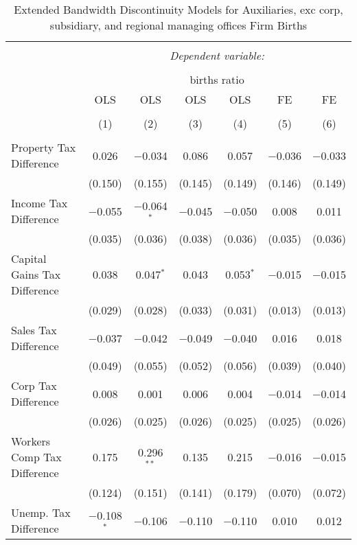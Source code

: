 
\begin{table}[!htbp] \centering 
  \caption{Extended Bandwidth Discontinuity Models for  Auxiliaries, exc corp, subsidiary, and regional managing offices Firm Births} 
  \label{95rd} 
\begin{tabular}{@{\extracolsep{5pt}}lcccccc} 
\\[-1.8ex]\hline 
\hline \\[-1.8ex] 
 & \multicolumn{6}{c}{\textit{Dependent variable:}} \\ 
\cline{2-7} 
\\[-1.8ex] & \multicolumn{6}{c}{births ratio} \\ 
 & OLS & OLS & OLS & OLS & FE & FE \\ 
\\[-1.8ex] & (1) & (2) & (3) & (4) & (5) & (6)\\ 
\hline \\[-1.8ex] 
 Property Tax Difference & 0.026 & $-$0.034 & 0.086 & 0.057 & $-$0.036 & $-$0.033 \\ 
  & (0.150) & (0.155) & (0.145) & (0.149) & (0.146) & (0.149) \\ 
  Income Tax Difference & $-$0.055 & $-$0.064$^{*}$ & $-$0.045 & $-$0.050 & 0.008 & 0.011 \\ 
  & (0.035) & (0.036) & (0.038) & (0.036) & (0.035) & (0.036) \\ 
  Capital Gains Tax Difference & 0.038 & 0.047$^{*}$ & 0.043 & 0.053$^{*}$ & $-$0.015 & $-$0.015 \\ 
  & (0.029) & (0.028) & (0.033) & (0.031) & (0.013) & (0.013) \\ 
  Sales Tax Difference & $-$0.037 & $-$0.042 & $-$0.049 & $-$0.040 & 0.016 & 0.018 \\ 
  & (0.049) & (0.055) & (0.052) & (0.056) & (0.039) & (0.040) \\ 
  Corp Tax Difference & 0.008 & 0.001 & 0.006 & 0.004 & $-$0.014 & $-$0.014 \\ 
  & (0.026) & (0.025) & (0.026) & (0.025) & (0.025) & (0.026) \\ 
  Workers Comp Tax Difference & 0.175 & 0.296$^{**}$ & 0.135 & 0.215 & $-$0.016 & $-$0.015 \\ 
  & (0.124) & (0.151) & (0.141) & (0.179) & (0.070) & (0.072) \\ 
  Unemp. Tax Difference & $-$0.108$^{*}$ & $-$0.106 & $-$0.110 & $-$0.110 & 0.010 & 0.012 \\ 

\end{tabular}
\end{table}
